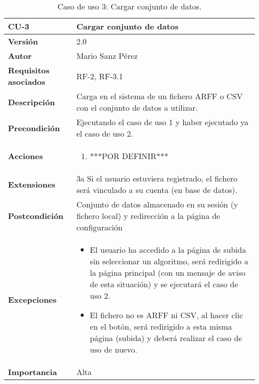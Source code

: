 \begin{table}[p]
	\centering
	\begin{tabularx}{\linewidth}{ p{} p{} }
		\toprule
		\textbf{CU-3}    & \textbf{Cargar conjunto de datos}\\
		\toprule
		\textbf{Versión}              & 2.0    \\
		\textbf{Autor}                & Mario Sanz Pérez \\
		\textbf{Requisitos asociados} & RF-2, RF-3.1 \\
		\textbf{Descripción}          & Carga en el sistema de un fichero ARFF o CSV con el conjunto de datos a utilizar. \\
		\textbf{Precondición}         & Ejecutando el caso de uso 1 y haber ejecutado ya el caso de uso 2.\\
		\textbf{Acciones}             &
		\begin{enumerate}
			\def\labelenumi{\arabic{enumi}.}
			\tightlist
			\item ***POR DEFINIR***
		\end{enumerate}\\
		\textbf{Extensiones}          & 3a Si el usuario estuviera registrado, el fichero será vinculado a su cuenta (en base de datos). \\
		\textbf{Postcondición}        & Conjunto de datos almacenado en su sesión (y fichero local) y redirección a la página de configuración \\
		\textbf{Excepciones}          & \begin{itemize}
			\item El usuario ha accedido a la página de subida sin seleccionar un algoritmo, será redirigido a la página principal (con un mensaje de aviso de esta situación) y se ejecutará el caso de uso 2.
			\item El fichero no es ARFF ni CSV, al hacer clic en el botón, será redirigido a esta misma página (subida) y deberá realizar el caso de uso de nuevo.
		\end{itemize} \\
		\textbf{Importancia}          & Alta \\
		\bottomrule
	\end{tabularx}
	\caption{Caso de uso 3: Cargar conjunto de datos.}
\end{table}


